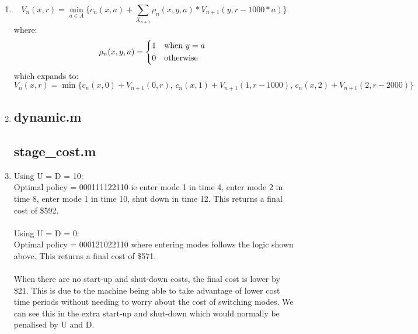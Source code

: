 \documentclass[10pt,a4paper]{article}
\begin{document}
\begin{enumerate}
	\item \begin{equation*}
	V_n(x, r) = \min_{a \in A}\bigg\{c_n(x, a) + \sum_{X_{n+1}} \rho_n(x, y, a)*V_{n+1}(y, r-1000*a)\bigg\}
	\end{equation*}
	where: \\
	\[
	\rho_n(x, y, a) = \begin{dcases*}
	1 & when $y=a$ \\
	0 & otherwise \\
	\end{dcases*}
	\]
	which expands to: \\
	\begin{equation*}
	V_n(x, r) = \min\bigg\{c_n(x, 0) + V_{n+1}(0, r),\, c_n(x, 1) + V_{n+1}(1, r-1000),\, c_n(x, 2) + V_{n+1}(2, r-2000)\bigg\}
	\end{equation*}
	
	\newpage
	\item \subsection*{dynamic.m} 
	\newpage
	\subsection*{stage\_cost.m} 
	
	\newpage
	\item Using U = D = 10: \\ Optimal policy = 000111122110 ie enter mode 1 in time 4, enter mode 2 in time 8, enter mode 1 in time 10, shut down in time 12. This returns a final cost of \$592. \\ \\
	Using U = D = 0: \\
	Optimal policy = 000121022110 where entering modes follows the logic shown above. This returns a final cost of \$571. \\ \\
	When there are no start-up and shut-down costs, the final cost is lower by \$21. This is due to the machine being able to take advantage of lower cost time periods without needing to worry about the cost of switching modes. We can see this in the extra start-up and shut-down which would normally be penalised by U and D.
	

\end{enumerate}
\end{document}
